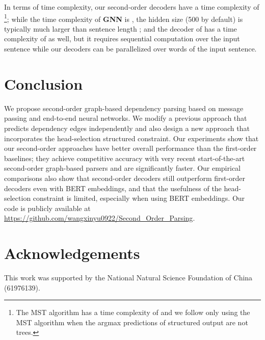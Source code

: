 \documentclass[11pt,a4paper]{article}
\begin{document}
In terms of time complexity, our second-order decoders have a time complexity of \footnote{The MST algorithm has a time complexity of  and we follow \citet{dozat-etal-2017-stanfords} only using the MST algorithm when the argmax predictions of structured output are not trees.}; while the time complexity of \textbf{GNN} is , the hidden size  (500 by default) is typically much larger than sentence length ; and the decoder of \citet{zhang2020efficient} has a time complexity of  as well, but it requires sequential computation over the input sentence while our decoders can be parallelized over words of the input sentence. 


\section{Conclusion}
We propose second-order graph-based dependency parsing based on message passing and end-to-end neural networks. We modify a previous approach that predicts dependency edges independently and also design a new approach that incorporates the head-selection structured constraint. Our experiments show that our second-order approaches have better overall performance than the first-order baselines; they achieve competitive accuracy with very recent start-of-the-art second-order graph-based parsers and are significantly faster. Our empirical comparisons also show that second-order decoders still outperform first-order decoders even with BERT embeddings, and that the usefulness of the head-selection constraint is limited, especially when using BERT embeddings. Our code is publicly available at \url{https://github.com/wangxinyu0922/Second_Order_Parsing}.

\section*{Acknowledgements}
This work was supported by the National Natural Science Foundation of China (61976139).




\end{document}
